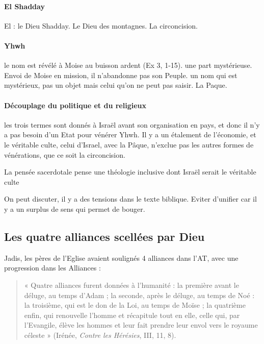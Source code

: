      
      \paragraph{El Shadday} El : le Dieu Shadday. Le Dieu des montagnes. La circoncision.
     
      
     
      \paragraph{Yhwh} le nom est révélé à Moise au buisson ardent (Ex 3, 1-15). une part mystérieuse. Envoi de Moise en mission, il n'abandonne pas son Peuple. un nom qui est mystérieux, pas un objet mais celui qu'on ne peut pas saisir. La Paque.
      
      \paragraph{Découplage du politique et du religieux} les trois termes sont donnés à Israël avant son organisation en pays, et donc il n'y a pas besoin d'un Etat pour vénérer Yhwh. Il y a un étalement de l'économie, et le véritable culte, celui d'Israel, avec la Pâque, n'exclue pas les autres formes de vénérations, que ce soit la circoncision.
      
      \begin{Synthesis}
      La pensée sacerdotale pense une théologie inclusive dont Israël serait le véritable culte
      \end{Synthesis}
      On peut discuter, il y a des tensions dans le texte biblique. Eviter d'unifier car il y a un surplus de sens qui permet de bouger.
      
      
  
   
    
    \subsection{Les quatre alliances scellées par Dieu}
    
    Jadis, les pères de l'Eglise avaient soulignés 4 alliances dans l'AT, avec une progression dans les Alliances : 
    
\begin{quote}
« Quatre alliances furent données à l'humanité : la première avant le
déluge, au temps d'Adam ; la seconde, après le déluge, au temps de Noé :
la troisième, qui est le don de la Loi, au temps de Moïse ; la quatrième
enfin, qui renouvelle l'homme et récapitule tout en elle, celle qui, par
l'Evangile, élève les hommes et leur fait prendre leur envol vers le
royaume céleste » (Irénée, \emph{Contre les Hérésies}, III, 11, 8).
\end{quote}
  

